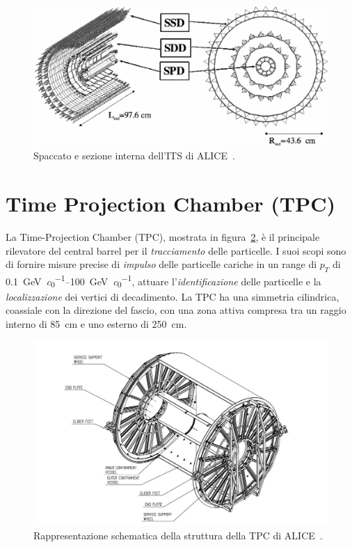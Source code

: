     \begin{figure}[h]
        \centering
        \includegraphics[width=1\linewidth]{res/fig/2-chapter/4-ALICE-ITS.jpg}
        \caption{Spaccato e sezione interna dell'ITS di ALICE~\cite{ALICE_2008}.}
        \label{fig:2-4-ALICE-ITS}
    \end{figure}

\section{Time Projection Chamber (TPC)}
    La Time-Projection Chamber (TPC), mostrata in figura~\ref{fig:2-5-ALICE-TPC}, è il principale rilevatore del central barrel per il \textit{tracciamento} delle particelle. I suoi scopi sono di fornire misure precise di \textit{impulso} delle particelle cariche in un range di $p_{T}$ di \qtyrange[per-mode = symbol, range-phrase = --, range-units = single]{0.1}{100}{\giga \eV \per \clight}, attuare l’\textit{identificazione} delle particelle e la \textit{localizzazione} dei vertici di decadimento. La TPC ha una simmetria cilindrica, coassiale con la direzione del fascio, con una zona attiva compresa tra un raggio interno di \qty{85}{\centi \meter} e uno esterno di \qty{250}{\centi \meter}.

    \begin{figure}[h]
        \centering
        \includegraphics[width=0.76\linewidth]{res/fig/2-chapter/5-ALICE-TPC.jpg}
        \caption{Rappresentazione schematica della struttura della TPC di ALICE~\cite{Korcari_2017}.}
        \label{fig:2-5-ALICE-TPC}
    \end{figure}

